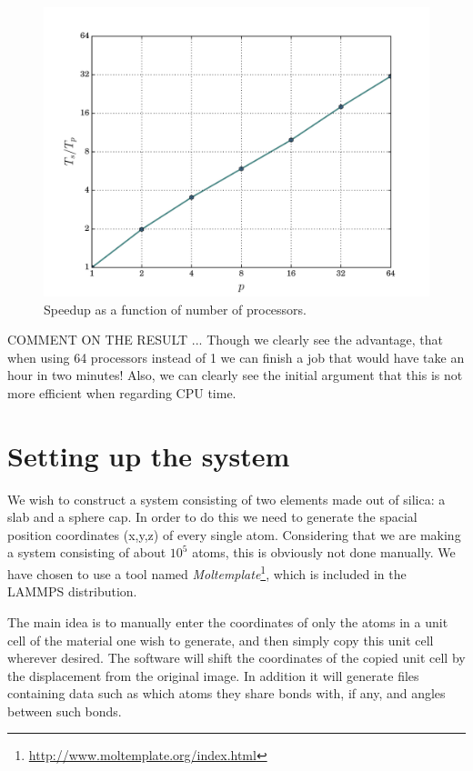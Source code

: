 \documentclass[twoside,english]{uiofysmaster}
\begin{document}
\begin{figure}[H]
\centering
\includegraphics[width=0.7\linewidth]{figures/speedup/15x15.pdf}
\caption{Speedup as a function of number of processors.}
\label{fig:speedup15x15}
\end{figure}

{\large {\color{editColor}COMMENT ON THE RESULT}}
... Though we clearly see the advantage, that when using 64 processors instead of 1 we can finish a job that would have take an hour in two minutes! Also, we can clearly see the initial argument that this is not more efficient when regarding CPU time. 
 





\chapter{Setting up the system}

We wish to construct a system consisting of {\color{red} two} elements made out of silica: a slab and a sphere cap. In order to do this we need to generate the spacial position coordinates (x,y,z) of every single atom. Considering that we are making a system consisting of about $10^5$ atoms, this is obviously not done manually. We have chosen to use a tool named \textit{Moltemplate}\footnote{\href{http://www.moltemplate.org/index.html}{http://www.moltemplate.org/index.html}}, which is included in the LAMMPS distribution.

The main idea is to manually enter the coordinates of only the atoms in a unit cell of the material one wish to generate, and then simply copy this unit cell wherever desired. The software will shift the coordinates of the copied unit cell by the displacement from the original image. In addition it will generate files containing data such as which atoms they share bonds with, if any, and angles between such bonds. 
\end{document}

